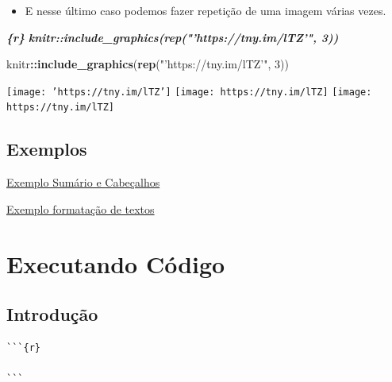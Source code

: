 \documentclass[
]{book}
\newenvironment{Shaded}{\begin{snugshade}}{\end{snugshade}}
\newcommand{\DecValTok}[1]{\textcolor[rgb]{0.00,0.00,0.81}{#1}}
\newcommand{\InformationTok}[1]{\textcolor[rgb]{0.56,0.35,0.01}{\textbf{\textit{#1}}}}
\newcommand{\KeywordTok}[1]{\textcolor[rgb]{0.13,0.29,0.53}{\textbf{#1}}}
\newcommand{\NormalTok}[1]{#1}
\newcommand{\OperatorTok}[1]{\textcolor[rgb]{0.81,0.36,0.00}{\textbf{#1}}}
\newcommand{\StringTok}[1]{\textcolor[rgb]{0.31,0.60,0.02}{#1}}
\providecommand{\tightlist}{%
  \setlength{\itemsep}{0pt}\setlength{\parskip}{0pt}}
\begin{document}
\begin{itemize}
\tightlist
\item
  E nesse último caso podemos fazer repetição de uma imagem várias vezes.
\end{itemize}

\begin{Shaded}
\begin{Highlighting}[]
\InformationTok{\textasciigrave{}\textasciigrave{}\textasciigrave{}\{r\}}
\InformationTok{knitr::include\_graphics(rep("'https://tny.im/lTZ'", 3))}
\InformationTok{\textasciigrave{}\textasciigrave{}\textasciigrave{}}
\end{Highlighting}
\end{Shaded}

\begin{Shaded}
\begin{Highlighting}[]
\NormalTok{knitr}\OperatorTok{::}\KeywordTok{include\_graphics}\NormalTok{(}\KeywordTok{rep}\NormalTok{(}\StringTok{"'https://tny.im/lTZ'"}\NormalTok{, }\DecValTok{3}\NormalTok{))}
\end{Highlighting}
\end{Shaded}

\texttt{[image: 'https://tny.im/lTZ']} \texttt{[image: https://tny.im/lTZ]} \texttt{[image: https://tny.im/lTZ]}

\hypertarget{exemplos}{%
\section{Exemplos}\label{exemplos}}

\href{exemplos/102-sumario_e_cabecalho.html}{Exemplo Sumário e Cabeçalhos}

\href{exemplos/103-formatacao_de_texto.html}{Exemplo formatação de textos}

\hypertarget{executando-cuxf3digo}{%
\chapter{Executando Código}\label{executando-cuxf3digo}}

\hypertarget{introduuxe7uxe3o}{%
\section{Introdução}\label{introduuxe7uxe3o}}

\begin{verbatim}
```{r}

```
\end{verbatim}
\end{document}
